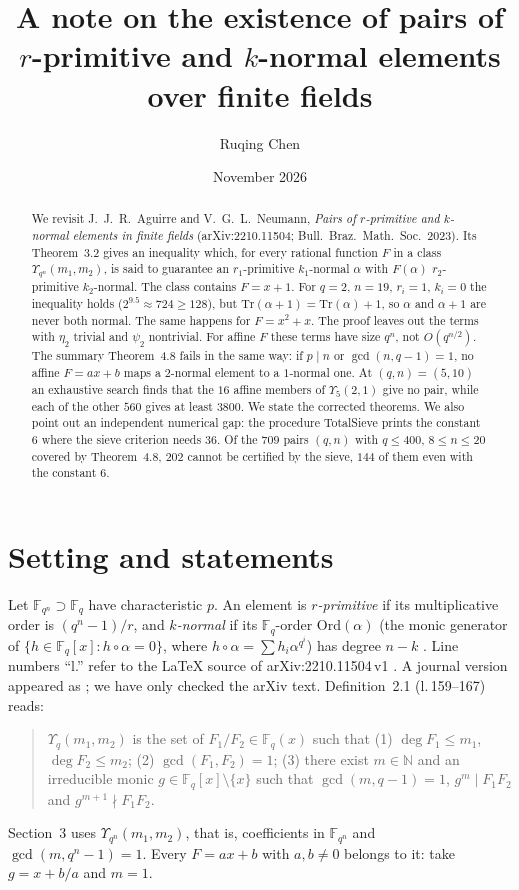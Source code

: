 \documentclass[11pt,a4paper]{amsart}
\title[Pairs of $r$-primitive and $k$-normal elements]{A note on the existence of pairs of $r$-primitive and $k$-normal elements over finite fields}
\author{Ruqing Chen}
\date{November 2026}
\theoremstyle{remark}
\newcommand{\Fq}{\mathbb{F}_q}
\newcommand{\Fqn}{\mathbb{F}_{q^n}}
\newcommand{\Tr}{\mathrm{Tr}}
\newcommand{\Ord}{\mathrm{Ord}}
\begin{document}
\begin{abstract}
We revisit J.~J.~R.~Aguirre and V.~G.~L.~Neumann, \emph{Pairs of $r$-primitive and $k$-normal elements in finite
fields} (arXiv:2210.11504; Bull.\ Braz.\ Math.\ Soc.\ 2023). Its Theorem~3.2 gives an inequality which, for every
rational function $F$ in a class $\Upsilon_{q^n}(m_1,m_2)$, is said to guarantee an $r_1$-primitive $k_1$-normal $\alpha$
with $F(\alpha)$ $r_2$-primitive $k_2$-normal. The class contains $F=x+1$. For $q=2$, $n=19$, $r_i=1$, $k_i=0$ the
inequality holds ($2^{9.5}\approx724\ge128$), but $\Tr(\alpha+1)=\Tr(\alpha)+1$, so $\alpha$ and $\alpha+1$ are never
both normal. The same happens for $F=x^2+x$. The proof leaves out the terms with $\eta_2$ trivial and $\psi_2$
nontrivial. For affine $F$ these terms have size $q^n$, not $O(q^{n/2})$. The summary Theorem~4.8 fails in the same
way: if $p\mid n$ or $\gcd(n,q-1)=1$, no affine $F=ax+b$ maps a $2$-normal element to a $1$-normal one. At $(q,n)=(5,10)$
an exhaustive search finds that the $16$ affine members of $\Upsilon_5(2,1)$ give no pair, while each of the other $560$
gives at least $3800$. We state the corrected theorems. We also point out an independent numerical gap: the
procedure TotalSieve prints the constant $6$ where the sieve criterion needs $36$. Of the $709$ pairs $(q,n)$ with
$q\le400$, $8\le n\le20$ covered by Theorem~4.8, $202$ cannot be certified by the sieve, $144$ of them even with
the constant $6$.
\end{abstract}
\maketitle

\section{Setting and statements}

Let $\Fqn\supset\Fq$ have characteristic $p$. An element is \emph{$r$-primitive} if its multiplicative order is
$(q^n-1)/r$, and \emph{$k$-normal} if its $\Fq$-order $\Ord(\alpha)$ (the monic generator of
$\{h\in\Fq[x]:h\circ\alpha=0\}$, where $h\circ\alpha=\sum h_i\alpha^{q^i}$) has degree $n-k$ \cite{HMPT}. Line numbers
``l.'' refer to the \LaTeX{} source of arXiv:2210.11504\,v1 \cite{AN}. A journal version appeared as
\cite{ANjournal}; we have only checked the arXiv text. Definition~2.1 (l.\,159--167) reads:
\begin{quote}\small
$\Upsilon_q(m_1,m_2)$ is the set of $F_1/F_2\in\Fq(x)$ such that (1) $\deg F_1\le m_1$, $\deg F_2\le m_2$;
(2) $\gcd(F_1,F_2)=1$; (3) there exist $m\in\mathbb{N}$ and an irreducible monic $g\in\Fq[x]\setminus\{x\}$ such that
$\gcd(m,q-1)=1$, $g^m\mid F_1F_2$ and $g^{m+1}\nmid F_1F_2$.
\end{quote}
Section~3 uses $\Upsilon_{q^n}(m_1,m_2)$, that is, coefficients in $\Fqn$ and $\gcd(m,q^n-1)=1$. Every $F=ax+b$ with
$a,b\neq0$ belongs to it: take $g=x+b/a$ and $m=1$.
\end{document}
